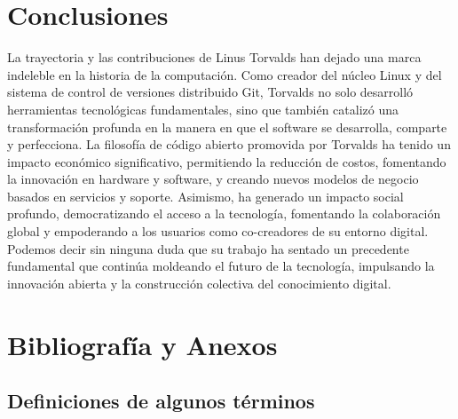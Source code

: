 \documentclass[a4paper,12pt]{article}
\begin{document}
\section{Conclusiones}
La trayectoria y las contribuciones de Linus Torvalds han dejado una marca
indeleble en la historia de la computación. Como creador del núcleo Linux y del
sistema de control de versiones distribuido Git, Torvalds no solo desarrolló
herramientas tecnológicas fundamentales, sino que también catalizó una
transformación profunda en la manera en que el software se desarrolla, comparte
y perfecciona.
La filosofía de código abierto promovida por Torvalds ha tenido un impacto
económico significativo, permitiendo la reducción de costos, fomentando la
innovación en hardware y software, y creando nuevos modelos de negocio basados
en servicios y soporte. Asimismo, ha generado un impacto social profundo,
democratizando el acceso a la tecnología, fomentando la colaboración global y
empoderando a los usuarios como co-creadores de su entorno digital.
Podemos decir sin ninguna duda que su trabajo ha sentado un precedente
fundamental que continúa moldeando el futuro de la tecnología, impulsando la
innovación abierta y la construcción colectiva del conocimiento digital. 

\newpage
\section{Bibliografía y Anexos}
\nocite{*}
\renewcommand{\refname}{}  

\newpage

\subsection*{Definiciones de algunos términos} 
\end{document}
